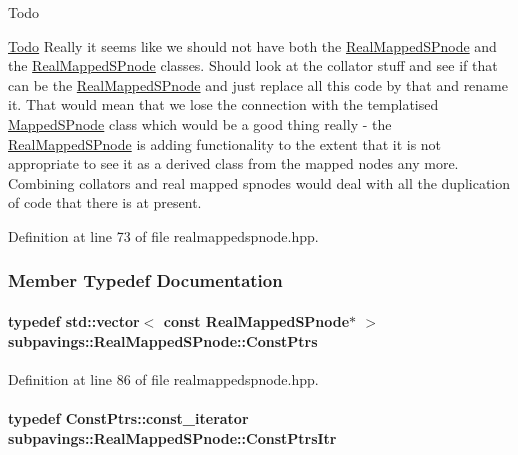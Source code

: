 \begin{DoxyRefDesc}{\-Todo}
\item[\hyperlink{todo__todo000007}{\-Todo}]\-Really it seems like we should not have both the \hyperlink{classsubpavings_1_1RealMappedSPnode}{\-Real\-Mapped\-S\-Pnode} and the \hyperlink{classsubpavings_1_1RealMappedSPnode}{\-Real\-Mapped\-S\-Pnode} classes. \-Should look at the collator stuff and see if that can be the \hyperlink{classsubpavings_1_1RealMappedSPnode}{\-Real\-Mapped\-S\-Pnode} and just replace all this code by that and rename it. \-That would mean that we lose the connection with the templatised \hyperlink{classsubpavings_1_1MappedSPnode}{\-Mapped\-S\-Pnode} class which would be a good thing really -\/ the \hyperlink{classsubpavings_1_1RealMappedSPnode}{\-Real\-Mapped\-S\-Pnode} is adding functionality to the extent that it is not appropriate to see it as a derived class from the mapped nodes any more. \-Combining collators and real mapped spnodes would deal with all the duplication of code that there is at present. \end{DoxyRefDesc}


\-Definition at line 73 of file realmappedspnode.\-hpp.



\subsubsection{\-Member \-Typedef \-Documentation}
\hypertarget{classsubpavings_1_1RealMappedSPnode_a5fc20ec0cd33f031e874f50251156e65}{
\paragraph[{\-Const\-Ptrs}]{\setlength{\rightskip}{0pt plus 5cm}typedef std\-::vector$<$ const {\bf \-Real\-Mapped\-S\-Pnode}$\ast$ $>$ {\bf subpavings\-::\-Real\-Mapped\-S\-Pnode\-::\-Const\-Ptrs}}}\label{classsubpavings_1_1RealMappedSPnode_a5fc20ec0cd33f031e874f50251156e65}


\-Definition at line 86 of file realmappedspnode.\-hpp.

\hypertarget{classsubpavings_1_1RealMappedSPnode_a528463bd540e2e3d4dc907ce78a3b03c}{
\paragraph[{\-Const\-Ptrs\-Itr}]{\setlength{\rightskip}{0pt plus 5cm}typedef \-Const\-Ptrs\-::const\-\_\-iterator {\bf subpavings\-::\-Real\-Mapped\-S\-Pnode\-::\-Const\-Ptrs\-Itr}}}\label{classsubpavings_1_1RealMappedSPnode_a528463bd540e2e3d4dc907ce78a3b03c}


